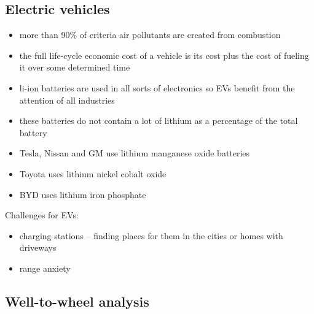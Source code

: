 \subsection{Electric vehicles}
\begin{itemize}
	\item more than 90\% of criteria air pollutants are created from
	combustion
	\item the full life-cycle economic cost of a vehicle is its cost plus
	the cost of fueling it over some determined time
	\item li-ion batteries are used in all sorts of electronics so EVs
	benefit from the attention of all industries
	\item these batteries do not contain a lot of lithium as a percentage
	of the total battery
	\item Tesla, Nissan and GM use lithium manganese oxide batteries
	\item Toyota uses lithium nickel cobalt oxide
	\item BYD uses lithium iron phosphate
\end{itemize}

Challenges for EVs:
\begin{itemize}
	\item charging stations -- finding places for them in the cities or
	homes with driveways
	\item range anxiety
\end{itemize}

\subsection{Well-to-wheel analysis}


